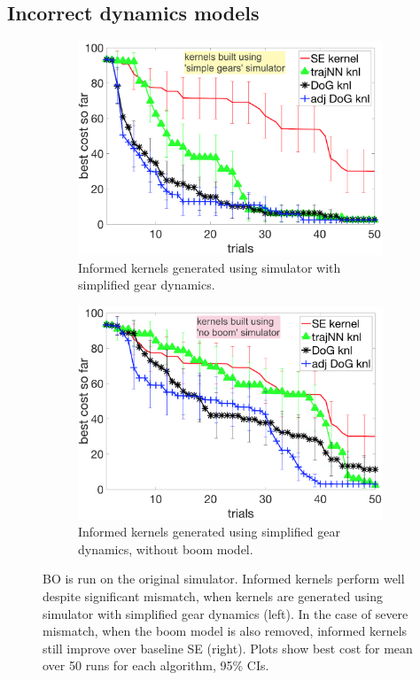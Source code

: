 \subsection{Incorrect dynamics models}
\begin{figure}[t]
\begin{subfigure}[t]{0.47\textwidth}
\centering
\includegraphics[width=1.0\textwidth]{img/compare_gear_dynamics.png}
\caption{\small{Informed kernels generated using simulator with simplified gear dynamics.}}
\label{fig:compare_gear_dynamics}
\end{subfigure}
\hspace{10px}
\begin{subfigure}[t]{0.47\textwidth}
\centering
\includegraphics[width=1.0\textwidth]{img/compare_without_boom.png}
\caption{\small{Informed kernels generated using simplified gear dynamics, without boom model.}}
\label{fig:compare_without_boom}
\end{subfigure}
\caption{\small{BO is run on the original simulator. Informed kernels perform well despite significant mismatch, when kernels are generated using simulator with simplified gear dynamics (left). In the case of severe mismatch, when the boom model is also removed, informed kernels still improve over baseline SE (right). Plots show best cost for mean over 50 runs for each algorithm, 95\% CIs.}}
\label{fig:compare_dog}
\end{figure} 
